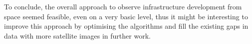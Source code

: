 To conclude, the overall approach to observe infrastructure development from space seemed feasible, even on a very basic level, thus it might be interesting to improve this approach by optimising the algorithms and fill the existing gaps in data with more satellite images in further work.





























